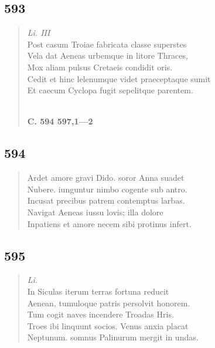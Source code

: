 \documentclass[11pt, a4paper]{report}
\begin{document}
            \subsection*{593}
      \begin{verse}
      \textit{Li. III} \\ Post casum Troiae fabricata classe superstes \\ Vela dat Aeneas urbemque in litore Thraces, \\ Mox aliam pulsus Cretaeis condidit oris. \\ Cedit et hinc lelenumque videt praeceptaque sumit \\ Et caecum Cyclopa fugit sepelitque parentem. \\ 
        ﻿\pagebreak 
    \begin{center} \textbf{C. 594 597,1—2} \end{center} \marginpar{[84]} 
      \end{verse}
  
            \subsection*{594}
      \begin{verse}
      Ardet amore gravi Dido. soror Anna suadet \\ Nubere. iunguntur nimbo cogente sub antro. \\ Incusat precibus patrem contemptus larbas. \\ Navigat Aeneas iussu lovis; illa dolore \\ Inpatiens et amore necem sibi protinus infert. \\ 
      \end{verse}
  
            \subsection*{595}
      \begin{verse}
      \textit{Li.} \\ In Siculas iterum terras fortuna reducit \\ Aenean, tumuloque patris persolvit honorem. \\ Tum cogit naves incendere Troadas Hris. \\ Troes ibi linquunt socios. Venus anxia placat \\ Neptunum. somnus Palinurum mergit in undas. \\ 
      \end{verse}
  
\end{document}
